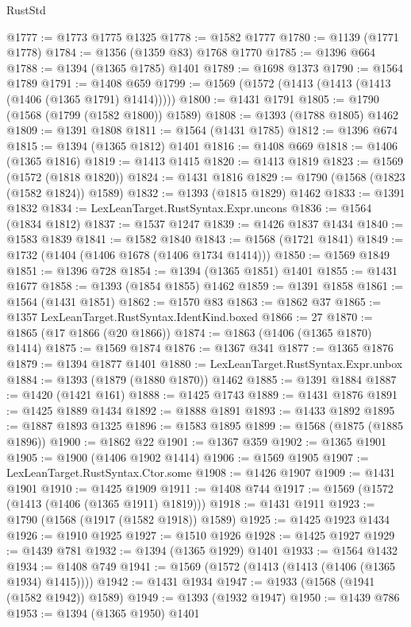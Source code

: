 \begin{lexlean}{RustStd}
\begin{coremodule}
@1777 := @1773 @1775 @1325
@1778 := @1582 @1777
@1780 := @1139 (@1771 @1778)
@1784 := @1356 (@1359 @83) @1768 @1770
@1785 := @1396 @664
@1788 := @1394 (@1365 @1785) @1401
@1789 := @1698 @1373
@1790 := @1564 @1789
@1791 := @1408 @659
@1799 := @1569 (@1572 (@1413 (@1413 (@1413 (@1406 (@1365 @1791) @1414)))))
@1800 := @1431 @1791
@1805 := @1790 (@1568 (@1799 (@1582 @1800)) @1589)
@1808 := @1393 (@1788 @1805) @1462
@1809 := @1391 @1808
@1811 := @1564 (@1431 @1785)
@1812 := @1396 @674
@1815 := @1394 (@1365 @1812) @1401
@1816 := @1408 @669
@1818 := @1406 (@1365 @1816)
@1819 := @1413 @1415
@1820 := @1413 @1819
@1823 := @1569 (@1572 (@1818 @1820))
@1824 := @1431 @1816
@1829 := @1790 (@1568 (@1823 (@1582 @1824)) @1589)
@1832 := @1393 (@1815 @1829) @1462
@1833 := @1391 @1832
@1834 := LexLeanTarget.RustSyntax.Expr.uncons
@1836 := @1564 (@1834 @1812)
@1837 := @1537 @1247
@1839 := @1426 @1837 @1434
@1840 := @1583 @1839
@1841 := @1582 @1840
@1843 := @1568 (@1721 @1841)
@1849 := @1732 (@1404 (@1406 @1678 (@1406 @1734 @1414)))
@1850 := @1569 @1849
@1851 := @1396 @728
@1854 := @1394 (@1365 @1851) @1401
@1855 := @1431 @1677
@1858 := @1393 (@1854 @1855) @1462
@1859 := @1391 @1858
@1861 := @1564 (@1431 @1851)
@1862 := @1570 @83
@1863 := @1862 @37
@1865 := @1357 LexLeanTarget.RustSyntax.IdentKind.boxed
@1866 := 27
@1870 := @1865 (@17 @1866 (@20 @1866))
@1874 := @1863 (@1406 (@1365 @1870) @1414)
@1875 := @1569 @1874
@1876 := @1367 @341
@1877 := @1365 @1876
@1879 := @1394 @1877 @1401
@1880 := LexLeanTarget.RustSyntax.Expr.unbox
@1884 := @1393 (@1879 (@1880 @1870)) @1462
@1885 := @1391 @1884
@1887 := @1420 (@1421 @161)
@1888 := @1425 @1743
@1889 := @1431 @1876
@1891 := @1425 @1889 @1434
@1892 := @1888 @1891
@1893 := @1433 @1892
@1895 := @1887 @1893 @1325
@1896 := @1583 @1895
@1899 := @1568 (@1875 (@1885 @1896))
@1900 := @1862 @22
@1901 := @1367 @359
@1902 := @1365 @1901
@1905 := @1900 (@1406 @1902 @1414)
@1906 := @1569 @1905
@1907 := LexLeanTarget.RustSyntax.Ctor.some
@1908 := @1426 @1907
@1909 := @1431 @1901
@1910 := @1425 @1909
@1911 := @1408 @744
@1917 := @1569 (@1572 (@1413 (@1406 (@1365 @1911) @1819)))
@1918 := @1431 @1911
@1923 := @1790 (@1568 (@1917 (@1582 @1918)) @1589)
@1925 := @1425 @1923 @1434
@1926 := @1910 @1925
@1927 := @1510 @1926
@1928 := @1425 @1927
@1929 := @1439 @781
@1932 := @1394 (@1365 @1929) @1401
@1933 := @1564 @1432
@1934 := @1408 @749
@1941 := @1569 (@1572 (@1413 (@1413 (@1406 (@1365 @1934) @1415))))
@1942 := @1431 @1934
@1947 := @1933 (@1568 (@1941 (@1582 @1942)) @1589)
@1949 := @1393 (@1932 @1947)
@1950 := @1439 @786
@1953 := @1394 (@1365 @1950) @1401

\end{coremodule}
\end{lexlean}
